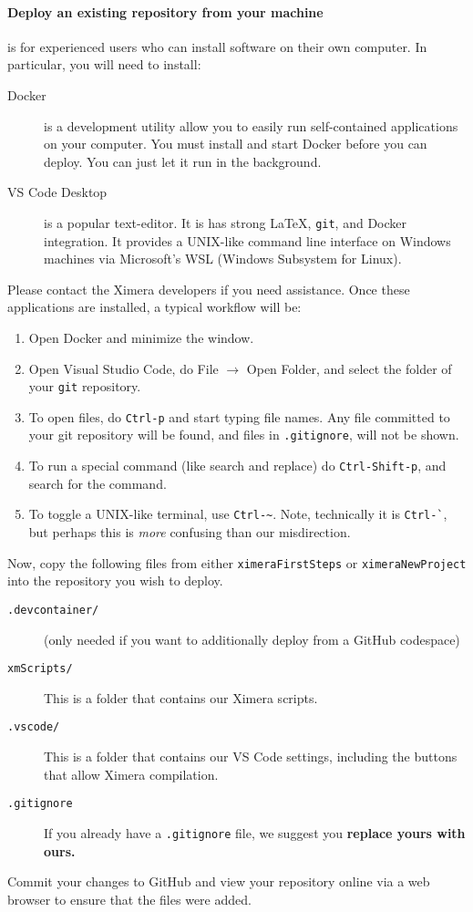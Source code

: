 \documentclass{ximera}
\begin{document}
\paragraph{Deploy an existing repository from your machine} is for experienced
users who can install software on their own computer. In particular, you will
need to install:
\begin{description}
    \item[Docker] is a development utility allow you to easily run
        self-contained applications on your
        computer. You must install and start Docker before you can deploy. You can just
        let
        it run in the background.
    \item[VS Code Desktop] is a popular text-editor. It is has strong \LaTeX, \verb!git!,
        and Docker integration. It provides a UNIX-like command line interface on
        Windows machines via Microsoft's WSL (Windows Subsystem for Linux).
\end{description}
Please contact the Ximera developers if you need assistance. Once these applications are installed, a typical workflow will be:
\begin{enumerate}
    \item Open Docker and minimize the window.
    \item Open Visual Studio Code, do File $\to$ Open Folder, and select the
          folder of your \verb!git! repository.
    \item To open files, do \verb!Ctrl-p! and start typing file names. Any
          file
          committed to your git repository will be found, and files in
          \verb!.gitignore!, will not be shown.
    \item To run a special command (like search and replace) do
          \verb!Ctrl-Shift-p!, and search for the command.
    \item To toggle a UNIX-like terminal, use \verb!Ctrl-~!. Note, technically
          it is \verb!Ctrl-`!, but perhaps this is \textit{more} confusing than our
          misdirection.
\end{enumerate}

Now, copy the following files from either \verb!ximeraFirstSteps! or
\verb!ximeraNewProject!
into the repository you wish to deploy.
\begin{description}
    \item[\texttt{.devcontainer/}] (only needed if you want to additionally
        deploy from
        a GitHub codespace)
    \item[\texttt{xmScripts/}] This is a folder that contains our Ximera
        scripts.
    \item[\texttt{.vscode/}] This is a folder that contains our VS Code
        settings, including the buttons that allow Ximera compilation.
    \item[\texttt{.gitignore}]	If you already have a \verb|.gitignore| file,
        we suggest
        you \textbf{replace yours with ours.}
\end{description}
Commit your changes to GitHub and view your repository online via a web browser
to ensure that the files were added.
\end{document}
